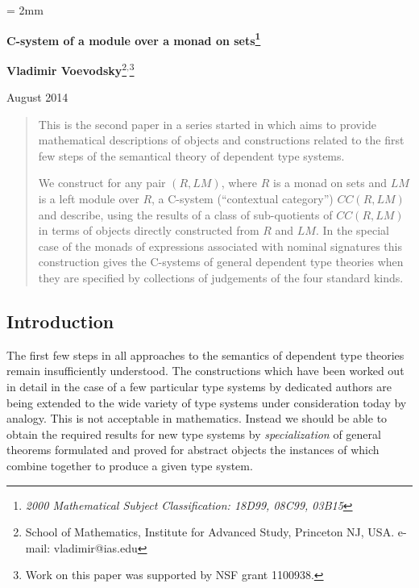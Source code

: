 \documentclass[11pt]{article}
\begin{document}
%
\parskip = 2mm
\begin{center}
{\bf\Large C-system of a module over a monad on sets\footnote{\em 2000 Mathematical Subject Classification: 18D99, 08C99, 03B15}}

\vspace{3mm}

{\large\bf Vladimir Voevodsky}\footnote{School of Mathematics, Institute for Advanced Study,
Princeton NJ, USA. e-mail: vladimir@ias.edu}$^,$\footnote{Work on this paper was supported by NSF grant 1100938.}
\vspace {3mm}

{August 2014}  
\end{center}

\begin{abstract}
This is the second paper in a series started in \cite{Csubsystems} which aims to provide mathematical descriptions of objects and constructions related to the first few steps of the semantical theory of dependent type systems. 

We construct for any pair $(R,LM)$, where $R$ is a monad on sets and $LM$ is a left module over $R$, a C-system (``contextual category'') $CC(R,LM)$ and describe, using the results of \cite{Csubsystems} a class of sub-quotients of $CC(R,LM)$ in terms of objects directly constructed from $R$ and $LM$. In the special case of the monads of expressions associated with  nominal signatures this construction gives the C-systems of general dependent type theories when they are specified by collections of judgements of the four standard kinds.
\end{abstract}


\subsection{Introduction}

The first few steps in all approaches to the semantics of dependent type theories remain insufficiently understood. The constructions which have been worked out in detail in the case of a few particular type systems by dedicated authors are being extended to the wide variety of type systems under consideration today by analogy. This is not acceptable in mathematics. Instead we should be able to obtain the required results for new type systems by {\em specialization} of general theorems formulated and proved for abstract objects the instances of which combine together to produce a given type system. 
\end{document}
